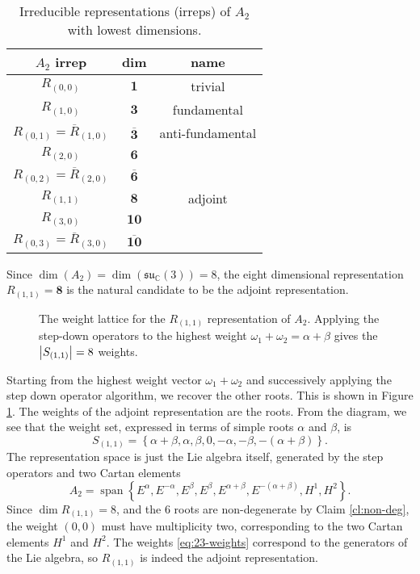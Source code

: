 \begin{table}[tbhp]
  \centering
  \begin{tabular}{ c | c  c }
    $A_2$ irrep & dim & name \\
    \hline
    $R_{(0,0)}$ & $\boldsymbol1$ & trivial \\
    $R_{(1, 0)}$ & $\boldsymbol 3$ & fundamental \\
    $R_{(0, 1)} = \overline{R}_{(1, 0)}$ & $\overline{\boldsymbol 3}{}$ & anti-fundamental \\
    $R_{(2, 0)}$ & $\boldsymbol 6$ &  \\
    $R_{(0, 2)} = \overline{R}_{(2, 0)}$ & $\overline{\boldsymbol 6}{}$ &  \\
    $R_{(1, 1)}$ & $\boldsymbol 8$ & adjoint \\
    $R_{(3, 0)}$ & $\boldsymbol{10}$ & \\
    $R_{(0, 3)} = \overline{R}_{(3, 0)}$ & $\overline{\boldsymbol{10}}{}$ &  \\
  \end{tabular}
  \caption{Irreducible representations (irreps) of $A_2$ with lowest dimensions.}
  \label{tab:23-1}
\end{table} 

Since $\dim(A_2) = \dim(\mathfrak{su}_{\mathbb{C}}(3)) = 8$, the eight dimensional representation $R_{(1,1)} = \boldsymbol 8$ is the natural candidate to be the adjoint representation.
\begin{figure}[tbhp]
  \centering
  \def\svgwidth{0.4\columnwidth}
  
  \caption{The weight lattice for the $R_{(1, 1)}$ representation of $A_2$. Applying the step-down operators to the highest weight $\omega_1 + \omega_2 = \alpha + \beta$ gives the $\abs{S_{(1, 1)}} = 8$ weights.}
  \label{fig:l23f1}
\end{figure}
Starting from the highest weight vector $\omega_1 + \omega_2$ and successively applying the step down operator algorithm, we recover the other roots.  This is shown in Figure \ref{fig:l23f1}. The weights of the adjoint representation are the roots. From the diagram, we see that the weight set, expressed in terms of simple roots $\alpha$ and $\beta$, is 
\begin{equation}
  \label{eq:23-weights}
  S_{(1, 1)} = \left\{\alpha + \beta, \alpha, \beta, 0, -\alpha, -\beta, -(\alpha + \beta) \right\}.
\end{equation}
The representation space is just the Lie algebra itself, generated by the step operators and two Cartan elements
\begin{equation}
  A_2 = \operatorname{span}\left\{ E^{\alpha}, E^{-\alpha}, E^{\beta}, E^{\beta}, E^{\alpha+ \beta}, E^{-(\alpha + \beta)}, H^1, H^2 \right\}.
\end{equation}
Since $\dim R_{(1, 1)} = 8$, and the 6 roots are non-degenerate by Claim \ref{cl:non-deg}, the weight $(0, 0)$ must have multiplicity two, corresponding to the two Cartan elements $H^1$ and $H^2$. The weights \eqref{eq:23-weights} correspond to the generators of the Lie algebra, so $R_{(1, 1)}$ is indeed the adjoint representation. 

